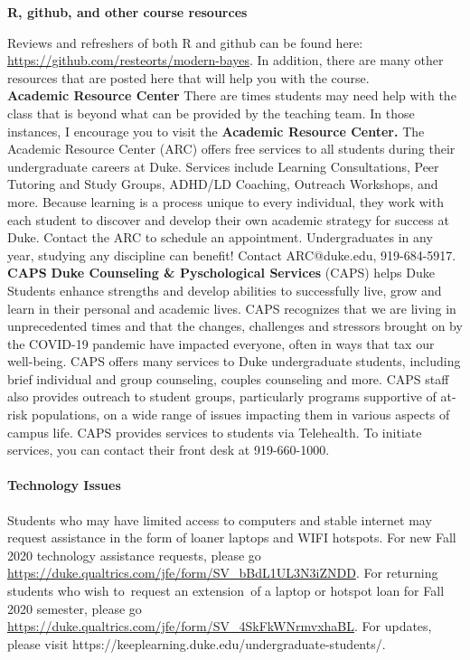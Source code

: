 \documentclass[11pt]{article}
\begin{document}
\textbf{R, github, and other course resources}

Reviews and refreshers of both R and github can be found here: \url{https://github.com/resteorts/modern-bayes}. In addition, there are many other resources that are posted here that will help you with the course. \\


\textbf{Academic Resource Center} There are times students may need help with the class that is beyond what can be provided by the teaching team. In those instances, I encourage you to visit the \textbf{Academic Resource Center.} The Academic Resource Center (ARC) offers free services to all students during their undergraduate careers at Duke. Services include Learning Consultations, Peer Tutoring and Study Groups, ADHD/LD Coaching, Outreach Workshops, and more. Because learning is a process unique to every individual, they work with each student to discover and develop their own academic strategy for success at Duke. Contact the ARC to schedule an appointment. Undergraduates in any year, studying any discipline can benefit! Contact ARC@duke.edu, 919-684-5917.\\

\textbf{CAPS}
\textbf{Duke Counseling \& Pyschological Services} (CAPS) helps Duke Students enhance strengths and develop abilities to successfully live, grow and learn in their personal and academic lives. CAPS recognizes that we are living in unprecedented times and that the changes, challenges and stressors brought on by the COVID-19 pandemic have impacted everyone, often in ways that tax our well-being. CAPS offers many services to Duke undergraduate students, including brief individual and group counseling, couples counseling and more. CAPS staff also provides outreach to student groups, particularly programs supportive of at-risk populations, on a wide range of issues impacting them in various aspects of campus life. CAPS provides services to students via Telehealth. To initiate services, you can contact their front desk at 919-660-1000.\\

\paragraph{Technology Issues}

Students who may have limited access to computers and stable internet may request assistance in the form of loaner laptops and WIFI hotspots.  For new Fall 2020 technology assistance requests, please go \url{https://duke.qualtrics.com/jfe/form/SV_bBdL1UL3N3iZNDD}.  For returning students who wish to request an extension of a laptop or hotspot loan for Fall 2020 semester, please go \url{https://duke.qualtrics.com/jfe/form/SV_4SkFkWNrmvxhaBL}. For updates, please visit https://keeplearning.duke.edu/undergraduate-students/.\\
\end{document}
